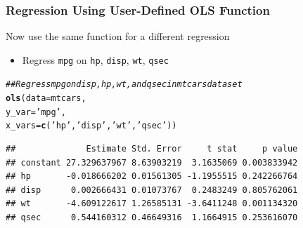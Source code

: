 \documentclass{beamer}\usepackage[]{graphicx}\usepackage[]{color}
\makeatletter
\newcommand{\hlstr}[1]{\textcolor[rgb]{0.192,0.494,0.8}{#1}}%
\newcommand{\hlcom}[1]{\textcolor[rgb]{0.678,0.584,0.686}{\textit{#1}}}%
\newcommand{\hlstd}[1]{\textcolor[rgb]{0.345,0.345,0.345}{#1}}%
\newcommand{\hlkwc}[1]{\textcolor[rgb]{0.333,0.667,0.333}{#1}}%
\newcommand{\hlkwd}[1]{\textcolor[rgb]{0.737,0.353,0.396}{\textbf{#1}}}%
\newenvironment{kframe}{%
 \def\at@end@of@kframe{}%
 \ifinner\ifhmode%
  \def\at@end@of@kframe{\end{minipage}}%
  \begin{minipage}{\columnwidth}%
 \fi\fi%
 \def\FrameCommand##1{\hskip\@totalleftmargin \hskip-\fboxsep
 \colorbox{shadecolor}{##1}\hskip-\fboxsep
     \hskip-\linewidth \hskip-\@totalleftmargin \hskip\columnwidth}%
 \MakeFramed {\advance\hsize-\width
   \@totalleftmargin\z@ \linewidth\hsize
   \@setminipage}}%
 {\par\unskip\endMakeFramed%
 \at@end@of@kframe}
\newenvironment{knitrout}{}{} %
\makeatother
\begin{document}
\begin{frame}[fragile]\frametitle{Regression Using User-Defined OLS Function}
    Now use the same function for a different regression
    \begin{itemize}
        \item Regress \texttt{mpg} on \texttt{hp}, \texttt{disp}, \texttt{wt}, \texttt{qsec}
    \end{itemize}
\begin{knitrout}\footnotesize
{}\color{fgcolor}\begin{kframe}
\begin{alltt}
\hlcom{## Regress mpg on disp, hp, wt, and qsec in mtcars dataset}
\hlkwd{ols}\hlstd{(}\hlkwc{data} \hlstd{= mtcars,}
    \hlkwc{y_var} \hlstd{=} \hlstr{'mpg'}\hlstd{,}
    \hlkwc{x_vars} \hlstd{=} \hlkwd{c}\hlstd{(}\hlstr{'hp'}\hlstd{,} \hlstr{'disp'}\hlstd{,} \hlstr{'wt'}\hlstd{,} \hlstr{'qsec'}\hlstd{))}
\end{alltt}
\begin{verbatim}
##              Estimate Std. Error     t stat     p value
## constant 27.329637967 8.63903219  3.1635069 0.003833942
## hp       -0.018666202 0.01561305 -1.1955515 0.242266764
## disp      0.002666431 0.01073767  0.2483249 0.805762061
## wt       -4.609122617 1.26585131 -3.6411248 0.001134320
## qsec      0.544160312 0.46649316  1.1664915 0.253616070
\end{verbatim}
\end{kframe}
\end{knitrout}
\end{frame}
\end{document}
